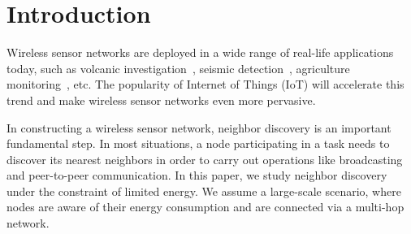 \section{Introduction}








Wireless sensor networks %
are deployed in
a wide range of real-life applications today, such as volcanic investigation~\cite{werner2006deploying}, 
seismic detection~\cite{suzuki2007high},
agriculture monitoring~\cite{wang2010l3sn}, etc.
The popularity of Internet of Things (IoT) will accelerate this trend
and make wireless sensor networks even more pervasive.

In constructing a wireless sensor network,
neighbor discovery is an important fundamental step.
In most situations, a node participating in a task needs to discover its nearest
neighbors in order to carry out operations like broadcasting and peer-to-peer
communication. In this paper, we study neighbor discovery under the
constraint of limited energy. We assume a
large-scale scenario, where nodes are aware of their energy consumption and
are connected via a multi-hop network.

